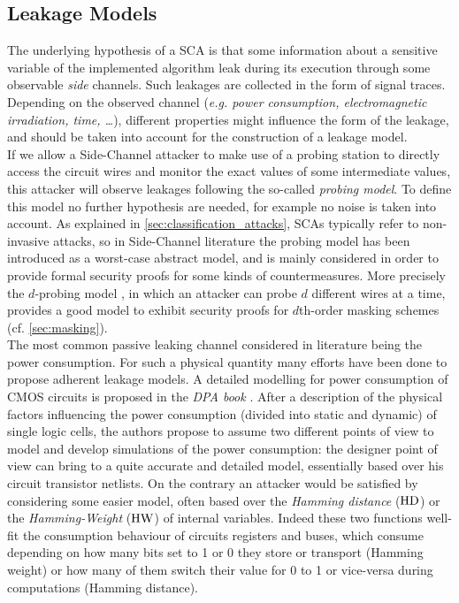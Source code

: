 \subsection{Leakage Models}\label{sec:leakage_model}
The underlying hypothesis of a SCA is that some information about  a sensitive variable of the implemented algorithm leak during its execution through some observable \emph{side} channels. Such leakages are collected 
in the form of signal traces. Depending on the observed channel (\emph{e.g. power consumption, electromagnetic irradiation, time, \dots}), different properties might influence the form of the leakage, and should be taken into account for the construction of a leakage model.\\
If we allow a Side-Channel attacker to make use of a probing station to directly access the circuit wires and monitor the exact values of some intermediate values, this attacker will observe leakages following the so-called \emph{probing model}. To define this model no further hypothesis are needed, for example no noise is taken into account. As explained in \ref{sec:classification_attacks}, SCAs typically refer to non-invasive attacks, so in Side-Channel literature the probing model has been introduced as a worst-case abstract model, and is mainly considered in order to provide formal security proofs for some kinds of countermeasures. More precisely the $d$-probing model \cite{ishai2003private}, in which an attacker can probe $d$ different wires at a time, provides a good model to exhibit security proofs for $d$th-order masking schemes (cf. \ref{sec:masking}). \\
The most common passive leaking channel considered in literature being the power consumption. For such a physical quantity many efforts have been done to propose adherent leakage models. A detailed modelling for power consumption of CMOS circuits is proposed in the \emph{DPA book} \cite{mangard2008power}. After a description of the physical factors influencing the power consumption (divided into static and dynamic) of single logic cells, the authors propose to assume two different points of view to model and develop simulations of the power consumption: the designer point of view can bring to a quite accurate and detailed model, essentially based over his circuit transistor netlists. On the contrary an attacker would be satisfied by considering some easier model, often based over the \emph{Hamming distance} ($\mathrm{HD}$) or the \emph{Hamming-Weight} ($\mathrm{HW}$) of internal variables. Indeed these two functions well-fit the consumption behaviour of circuits registers and buses, which consume depending on how many bits set to 1 or 0 they store or transport (Hamming weight) or how many of them switch their value for 0 to 1 or vice-versa during computations (Hamming distance). \\
